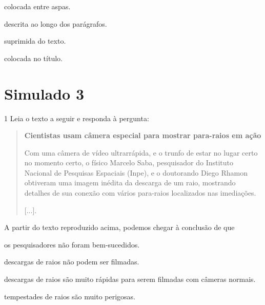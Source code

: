 \begin{escolha}
\item colocada entre aspas.

\item descrita ao longo dos parágrafos.

\item suprimida do texto.

\item colocada no título.
\end{escolha}


\chapter{Simulado 3}

\num{1} Leia o texto a seguir e responda à pergunta:

\begin{quote}
\textbf{Cientistas usam câmera especial para mostrar para-raios em ação}

Com uma câmera de vídeo ultrarrápida, e o trunfo de estar no lugar
certo no momento certo, o físico Marcelo Saba, pesquisador do Instituto
Nacional de Pesquisas Espaciais (Inpe), e o doutorando Diego Rhamon
obtiveram uma imagem inédita da descarga de um raio, mostrando detalhes
de sua conexão com vários para-raios localizados nas imediações.

{[}...{]}.

\end{quote}

A partir do texto reproduzido acima, podemos chegar à conclusão de que

\begin{escolha}
\item os pesquisadores não foram bem-sucedidos.

\item descargas de raios não podem ser filmadas.

\item descargas de raios são muito rápidas para serem filmadas com câmeras normais.

\item tempestades de raios são muito perigosas.
\end{escolha}

